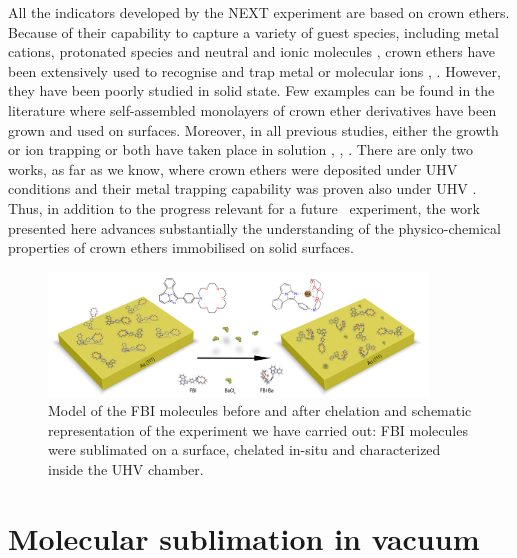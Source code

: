 \documentclass[aps,prl,reprint,longbibliography,superscriptaddress, english]{revtex4-1}
\begin{document}
All the indicators developed by the NEXT experiment are based on crown ethers. Because of their capability to capture a variety of guest species, including metal cations, protonated species and neutral and ionic molecules \cite{dobler1981ionophores}, crown ethers \cite{gokel_crown_1991} have been extensively used to recognise and trap metal or molecular ions \cite{more_intrinsic_1999}, \cite{maleknia_cavity-size-dependent_2002}. However, they have been poorly studied in solid state. Few examples can be found in the literature where self-assembled monolayers of crown ether derivatives have been grown and used on surfaces. Moreover, in all previous studies, either the growth or ion trapping or both have taken place in solution \cite{yoshimoto_hostguest_2003}, \cite{flink_recognition_1999}, \cite{inokuchi_new_2015}. 
 There are only two works, as far as we know, where crown ethers were deposited under UHV conditions \cite{feng_growth_2018} and their metal trapping capability was proven also under UHV \cite{stredansky_-surface_2019}. Thus, in addition to the progress relevant for a future \bbonu\ experiment, the work presented here advances substantially the understanding of the physico-chemical properties of crown ethers immobilised on solid surfaces. 
 

 \begin{figure}[ht!]
	\includegraphics[width=0.9\textwidth]{figures/figura_1a.jpg}
	\caption{\label{ModeloFBI} 
    Model of the FBI molecules before and after chelation and schematic representation of the experiment we have carried out: FBI molecules were sublimated on a surface, chelated in-situ and characterized inside the UHV chamber.}
\end{figure}  


\section{Molecular sublimation in vacuum}
\end{document}

